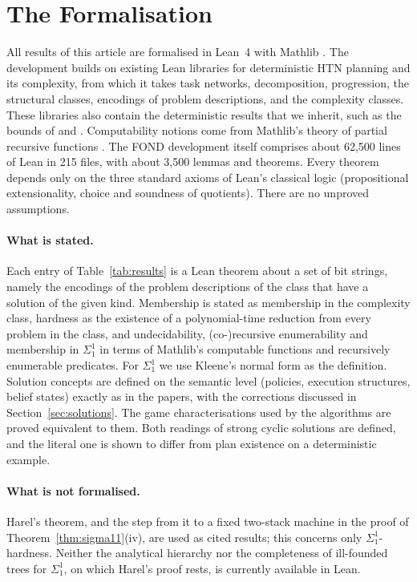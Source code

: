 \section{The Formalisation}\label{sec:formal}

All results of this article are formalised in Lean~4 \parencite{moura:ullrich:cade-21} with
Mathlib \parencite{mathlib:cpp-20}. The development builds on existing Lean libraries for
deterministic HTN planning and its complexity, from which it takes task networks, decomposition,
progression, the structural classes, encodings of problem descriptions, and the complexity
classes. These libraries also contain the deterministic results that we inherit, such as the
bounds of \textcite{erol:et:al:amai-96} and \textcite{alford:et:al:icaps-15}. Computability
notions come from Mathlib's theory of partial recursive functions \parencite{carneiro:itp-19}.
The FOND development itself comprises about 62{,}500 lines of Lean in 215 files, with about
3{,}500 lemmas and theorems. Every theorem depends only on the three standard axioms of Lean's
classical logic (propositional extensionality, choice and soundness of quotients). There are no
unproved assumptions.

\paragraph{What is stated.}
Each entry of Table~\ref{tab:results} is a Lean theorem about a set of bit strings, namely the
encodings of the problem descriptions of the class that have a solution of the given kind.
Membership is stated as membership in the complexity class, hardness as the existence of a
polynomial-time reduction from every problem in the class, and undecidability, (co-)recursive
enumerability and membership in $\Sigma^1_1$ in terms of Mathlib's computable functions and
recursively enumerable predicates. For $\Sigma^1_1$ we use Kleene's normal form as the definition.
Solution concepts are defined on the semantic level (policies, execution structures, belief
states) exactly as in the papers, with the corrections discussed in
Section~\ref{sec:solutions}. The game characterisations used by the algorithms are proved
equivalent to them. Both readings of strong cyclic solutions are defined, and the literal one is
shown to differ from plan existence on a deterministic example.

\paragraph{What is not formalised.}
Harel's theorem, and the step from it to a fixed two-stack machine in the proof of
Theorem~\ref{thm:sigma11}(iv), are used as cited results; this concerns only
$\Sigma^1_1$-hardness. Neither the analytical hierarchy nor the completeness of ill-founded trees
for $\Sigma^1_1$, on which Harel's proof rests, is currently available in Lean.

